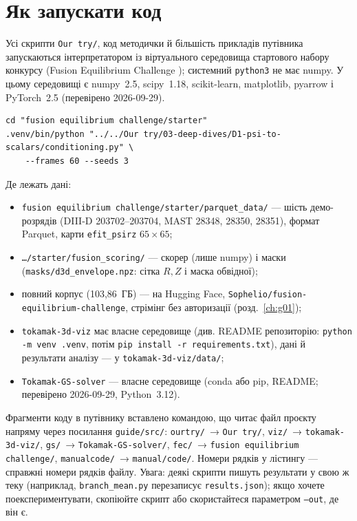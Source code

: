 \section{Як запускати код}\label{sec:g00-run}

Усі скрипти \texttt{Our try/}, код методички й більшість прикладів путівника
запускаються інтерпретатором із віртуального середовища стартового набору конкурсу
(Fusion Equilibrium Challenge \cite{FEC}); системний \texttt{python3} не має numpy.
У цьому середовищі є numpy~2.5, scipy~1.18, scikit-learn, matplotlib, pyarrow і
PyTorch~2.5 (перевірено 2026-09-29).
\begin{verbatim}
cd "fusion equilibrium challenge/starter"
.venv/bin/python "../../Our try/03-deep-dives/D1-psi-to-scalars/conditioning.py" \
    --frames 60 --seeds 3
\end{verbatim}
Де лежать дані:
\begin{itemize}
\item \texttt{fusion equilibrium challenge/starter/parquet\_data/} --- шість демо-розрядів
  (DIII-D 203702--203704, MAST 28348, 28350, 28351), формат Parquet, карти
  \texttt{efit\_psirz} $65\times65$;
\item \texttt{\ldots/starter/fusion\_scoring/} --- скорер (лише numpy) і маски
  (\texttt{masks/d3d\_envelope.npz}: сітка $R,Z$ і маска обвідної);
\item повний корпус (103,86~ГБ) --- на Hugging Face, \texttt{Sophelio/\allowbreak fusion-equilibrium-challenge},
  стрімінг без авторизації (розд.~\ref{ch:g01});
\item \texttt{tokamak-3d-viz} має власне середовище (див. README репозиторію: \texttt{python -m venv .venv}, потім \texttt{pip install -r requirements.txt}), дані й результати аналізу --- у
  \texttt{tokamak-3d-viz/data/};
\item \texttt{Tokamak-GS-solver} --- власне середовище (conda або pip, README; перевірено
  2026-09-29, Python~3.12).
\end{itemize}
Фрагменти коду в путівнику вставлено командою, що читає файл проєкту напряму через
посилання \texttt{guide/src/}: \texttt{ourtry/}~→ \texttt{Our try/}, \texttt{viz/}~→
\texttt{tokamak-3d-viz/}, \texttt{gs/}~→ \texttt{Tokamak-GS-solver/}, \texttt{fec/}~→
\texttt{fusion equilibrium challenge/}, \texttt{manualcode/}~→ \texttt{manual/code/}.
Номери рядків у лістингу --- справжні номери рядків файлу. Увага: деякі скрипти пишуть
результати у свою ж теку (наприклад, \texttt{branch\_mean.py} перезаписує
\texttt{results.json}); якщо хочете поекспериментувати, скопіюйте скрипт або скористайтеся
параметром \texttt{--out}, де він є.

